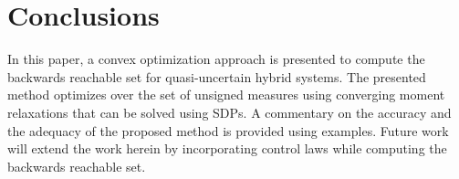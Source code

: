 \section{Conclusions}
\label{sec:conclusion}

In this paper, a convex optimization approach is presented to compute the backwards reachable set for quasi-uncertain hybrid systems.
The presented method optimizes over the set of unsigned measures using converging moment relaxations that can be solved using SDPs.
A commentary on the accuracy and the adequacy of the proposed method is provided using examples. 
Future work will extend the work herein by incorporating control laws while computing the backwards reachable set.